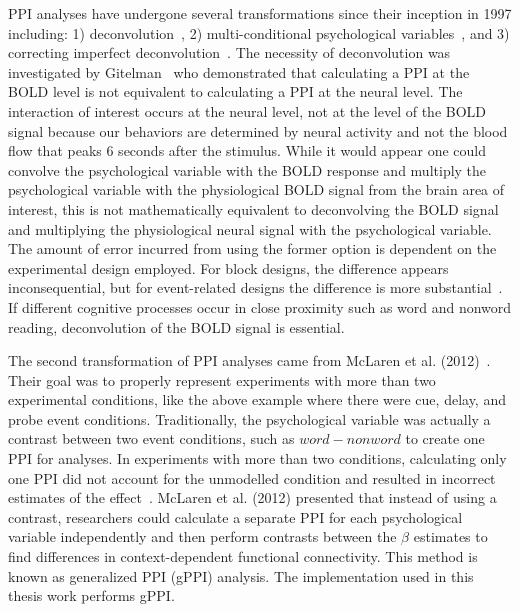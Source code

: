 \documentclass[phd,appendix,figures]{uithesis}
\begin{document}
PPI analyses have undergone several transformations since their inception in 1997 including:
1) deconvolution~\cite{Gitelman2003}, 2) multi-conditional psychological variables~\cite{McLaren2012},
and 3) correcting imperfect deconvolution~\cite{Di2017}.
The necessity of deconvolution was investigated by Gitelman~\cite{Gitelman2003} who demonstrated
that calculating a PPI at the BOLD level is not equivalent to calculating
a PPI at the neural level.
The interaction of interest occurs at the neural level, not at the level of the BOLD signal
because our behaviors are determined by neural activity and not the blood flow that peaks 6 seconds
after the stimulus.
While it would appear one could convolve the psychological variable with the BOLD response and
multiply the psychological variable with the physiological BOLD signal from the brain area of interest,
this is not mathematically equivalent to deconvolving the BOLD signal and multiplying the physiological
neural signal with the psychological variable.
The amount of error incurred from using the former option is dependent on the experimental
design employed.
For block designs, the difference appears inconsequential, but for event-related designs
the difference is more substantial~\cite{Gitelman2003}.
If different cognitive processes occur in close proximity such as word and nonword
reading, deconvolution of the BOLD signal is essential.

The second transformation of PPI analyses came from McLaren et al. (2012)~\cite{McLaren2012}.
Their goal was to properly represent experiments with more than two experimental conditions, like
the above example where there were cue, delay, and probe event conditions.
Traditionally, the psychological variable was actually a contrast between two event conditions, such as
$word - nonword$ to create one PPI for analyses.
In experiments with more than two conditions, calculating only one PPI did not account
for the unmodelled condition and resulted in incorrect estimates of the effect~\cite{McLaren2012}.
McLaren et al. (2012) presented that instead of using a contrast, researchers could
calculate a separate PPI for each psychological variable independently and then
perform contrasts between the $\beta$ estimates to find differences in context-dependent functional connectivity.
This method is known as generalized PPI (gPPI) analysis.
The implementation used in this thesis work performs gPPI.
\end{document}
